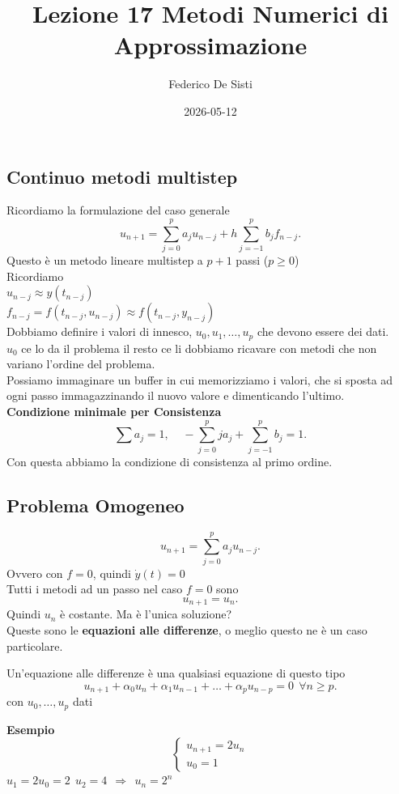 \documentclass[12px]{article}
\title{Lezione 17 Metodi Numerici di Approssimazione}
\date{2026-05-12}
\author{Federico De Sisti}
\begin{document}
	\maketitle
	\newpage
	\subsection{Continuo metodi multistep}
	Ricordiamo la formulazione del caso generale
	\[
		u_{n+1} = \sum^{p}_{j=0}a_ju_{n-j} + h\sum^{p}_{j=-1}b_jf_{n-j}
	.\] 
	Questo è un metodo lineare multistep a $p+1$ passi ($p\geq 0$)\\
	Ricordiamo\\
	$u_{n-j} \approx y(t_{n-j})$\\
	$f_{n-j} = f(t_{n-j},u_{n-j})\approx f(t_{n-j},y_{n-j})$\\
	Dobbiamo definire i valori di innesco, $u_0,u_1,\ldots,u_p$ che devono essere dei dati.\\
	$u_0$ ce lo da il problema il resto ce li dobbiamo ricavare con metodi che non variano l'ordine del problema.\\
	Possiamo immaginare un buffer in cui memorizziamo i valori, che si sposta ad ogni passo immagazzinando il nuovo valore e dimenticando l'ultimo.\\
	\textbf{Condizione minimale per Consistenza}
	\[
	\sum^{}_{}a_j = 1, \ \  \ \ \ - \sum^{p}_{j=0}ja_j + \sum^{p}_{j=-1}b_j=1
	.\] 
	Con questa abbiamo la condizione di consistenza al primo ordine.\\
	\subsection{Problema Omogeneo}
	\[
		u_{n+1} = \sum^{p}_{j=0}a_ju_{n-j}
	.\] 
	Ovvero con  $f = 0$, quindi $\dot y(t) = 0$\\
	Tutti i metodi ad un passo nel caso $f = 0$ sono
	\[
		u_{n+1} =u_n
	.\] 
	Quindi $u_n$ è costante. Ma è l'unica soluzione?\\
	Queste sono le \textbf{equazioni alle differenze}, o meglio questo ne è un caso particolare.
	\begin{defi}
		Un'equazione alle differenze è una qualsiasi equazione di questo tipo
		\[
			u_{n+1} + \alpha_0u_n + \alpha_1u_{n-1} + \ldots + \alpha_pu_{n-p} =0 \ \ \forall n\geq p
		.\] 
		con $u_0,\ldots,u_p$ dati
	\end{defi}
	\textbf{Esempio}\\
	 \[\begin{cases}
	u_{n+1} = 2u_n\\
		u_0=1
\end{cases}\]
$u_1 = 2u_0 = 2 \  \ u_2 = 4  \ \ \Rightarrow \ \ u_n = 2^n$\\
\end{document}
